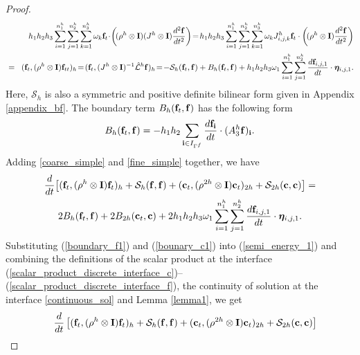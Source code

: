 \begin{proof}
\footnotesize
	\begin{eqnarray}\label{fine_simple}
	&&h_1h_2h_3\sum_{i = 1}^{n_1^{h}}\sum_{j=1}^{n_2^{h}}\sum_{k=1}^{n_3^{h}}\omega_k{\bf f}_t\!\cdot\!\left(\!(\rho^{h}\otimes{\bf I})(J^{h}\otimes{\bf I})\frac{d^2{\bf f}}{dt^2}\right) \!=\! h_1h_2h_3\sum_{i = 1}^{n_1^{h}}\sum_{j=1}^{n_2^{h}}\sum_{k=1}^{n_3^{h}}\omega_kJ^{h}_{i,j,k}{\bf f}_t\cdot\left(\!(\rho^{h}\otimes{\bf I})\frac{d^2{\bf f}}{dt^2}\right)\\
	&=&\! ({\bf f}_t, (\rho^{h}\otimes {\bf I}){\bf f}_{tt})_{h} \!=\! ({\bf f}_t,(J^{h}\otimes {\bf I})^{-1}\hat{\mathcal{L}}^{h}{\bf f})_{h} \!=\! -\mathcal{S}_{h}({\bf f}_t,{\bf f}) + B_{h}({\bf f}_t,{{\bf f}})+h_1h_2h_3\omega_1\sum_{i = 1}^{n_1^h}\sum_{j=1}^{n_2^h} \frac{d{\bf f}_{i,j,1}}{dt}\cdot{\bm \eta}_{i,j,1}.\nonumber
	\end{eqnarray}
\normalsize
Here, $\mathcal{S}_h$ is also a symmetric and positive definite bilinear form given in Appendix \ref{appendix_bf}. The boundary term $B_h ({\bf f}_t,{\bf f})$ has the following form
	\begin{equation}\label{boundary_f1}
	B_h ({\bf f}_t,{\bf f}) = -h_1h_2\sum_{{\bf i}\in I_{\Gamma^f}}\frac{d{\bf f}_{\bf i}}{dt}\cdot(A_3^h {\bf f})_{\bf i}.
	\end{equation}
	 Adding \eqref{coarse_simple} and \eqref{fine_simple} together, we have
	\begin{multline}\label{semi_energy_1}
	\frac{d}{dt}\big[({\bf f}_t,(\rho^h\otimes {\bf I}) {\bf f}_t)_h + \mathcal{S}_{h}({\bf f},{\bf f}) + ({\bf c}_t,(\rho^{2h}\otimes {\bf I}) {\bf c}_t)_{2h} + \mathcal{S}_{2h}({\bf c},{\bf c}) \big]  = \\
	2B_{h}({\bf f}_t,{\bf f}) + 2B_{2h}({\bf c}_t,{\bf c}) + 2h_1h_2h_3\omega_1\sum_{i = 1}^{n_1^h}\sum_{j=1}^{n_2^h}\frac{d{\bf f}_{i,j,1}}{dt}\cdot{\bm \eta}_{i,j,1}.
	\end{multline}
	Substituting (\ref{boundary_f1}) and (\ref{bounary_c1}) into (\ref{semi_energy_1}) and combining the definitions of the scalar product at the interface (\ref{scalar_product_discrete_interface_c})--(\ref{scalar_product_discrete_interface_f}), the continuity of solution at the interface \eqref{continuous_sol} and Lemma \ref{lemma1}, we get
	\begin{align*}%
	&\hspace{0.4cm}\frac{d}{dt}\left[({\bf f}_t,(\rho^h\otimes {\bf I}) {\bf f}_t)_{h} + \mathcal{S}_{h}({\bf f},{\bf f}) + ({\bf c}_t,(\rho^{2h}\otimes {\bf I}) {\bf c}_t)_{2h} + \mathcal{S}_{2h}({\bf c},{\bf c}) \right]   \\%

\end{align*}
\end{proof}
